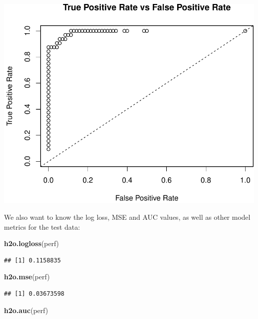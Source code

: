 \documentclass[]{article}
\newenvironment{Shaded}{\begin{snugshade}}{\end{snugshade}}
\newcommand{\KeywordTok}[1]{\textcolor[rgb]{0.13,0.29,0.53}{\textbf{{#1}}}}
\newcommand{\NormalTok}[1]{{#1}}
\begin{document}
\begin{center}\includegraphics{webinar_code_files/figure-latex/auc_curve-1} \end{center}

We also want to know the log loss, MSE and AUC values, as well as other
model metrics for the test data:

\begin{Shaded}
\begin{Highlighting}[]
\KeywordTok{h2o.logloss}\NormalTok{(perf)}
\end{Highlighting}
\end{Shaded}

\begin{verbatim}
## [1] 0.1158835
\end{verbatim}

\begin{Shaded}
\begin{Highlighting}[]
\KeywordTok{h2o.mse}\NormalTok{(perf)}
\end{Highlighting}
\end{Shaded}

\begin{verbatim}
## [1] 0.03673598
\end{verbatim}

\begin{Shaded}
\begin{Highlighting}[]
\KeywordTok{h2o.auc}\NormalTok{(perf)}
\end{Highlighting}
\end{Shaded}
\end{document}
